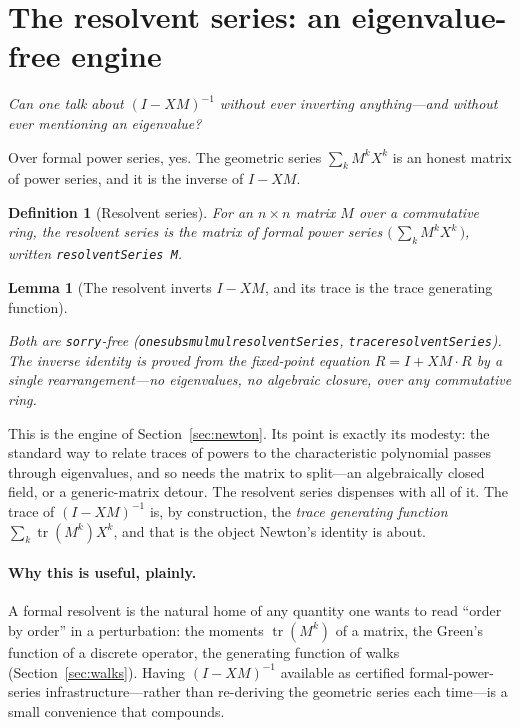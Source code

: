 \documentclass[11pt]{article}
\newtheorem{lemma}{Lemma}
\newtheorem{definition}{Definition}
\newcommand{\lean}[1]{{\def\_{\textunderscore\allowbreak}\texttt{#1}}}
\newcommand{\tr}{\operatorname{tr}}
\newcommand{\keyeq}[1]{\begin{center}\keybox{$\displaystyle #1$}\end{center}}
\begin{document}
\section{The resolvent series: an eigenvalue-free engine}
\label{sec:resolvent}

\emph{Can one talk about $(I-XM)^{-1}$ without ever inverting anything---and without ever mentioning
an eigenvalue?}

Over formal power series, yes. The geometric series $\sum_k M^kX^k$ is an honest matrix of power
series, and it is the inverse of $I-XM$.

\begin{definition}[Resolvent series]
For an $n\times n$ matrix $M$ over a commutative ring, the \emph{resolvent series} is the matrix of
formal power series $\bigl(\,\sum_k M^k X^k\,\bigr)$, written \lean{resolventSeries M}.
\end{definition}

\begin{lemma}[The resolvent inverts $I-XM$, and its trace is the trace generating function]
\label{lem:resolvent}
\keyeq{(I-XM)\cdot\textstyle\sum_k M^kX^k\;=\;I,\qquad
   \tr\!\bigl(\textstyle\sum_k M^kX^k\bigr)\;=\;\sum_k \tr(M^k)\,X^k.}
Both are \lean{sorry}-free (\lean{one\_sub\_smul\_mul\_resolventSeries},
\lean{trace\_resolventSeries}). The inverse identity is proved from the fixed-point equation
$R=I+XM\!\cdot\!R$ by a single rearrangement---no eigenvalues, no algebraic closure, over any
commutative ring.
\end{lemma}

This is the engine of Section~\ref{sec:newton}. Its point is exactly its modesty: the standard way to
relate traces of powers to the characteristic polynomial passes through eigenvalues, and so needs the
matrix to split---an algebraically closed field, or a generic-matrix detour. The resolvent series
dispenses with all of it. The trace of $(I-XM)^{-1}$ is, by construction, the \emph{trace generating
function} $\sum_k\tr(M^k)X^k$, and that is the object Newton's identity is about.

\paragraph{Why this is useful, plainly.}
A formal resolvent is the natural home of any quantity one wants to read ``order by order'' in a
perturbation: the moments $\tr(M^k)$ of a matrix, the Green's function of a discrete operator, the
generating function of walks (Section~\ref{sec:walks}). Having $(I-XM)^{-1}$ available as certified
formal-power-series infrastructure---rather than re-deriving the geometric series each time---is a
small convenience that compounds.
\end{document}
